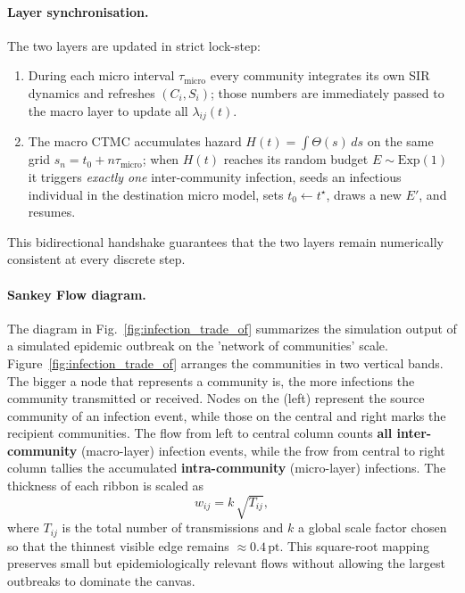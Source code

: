 \documentclass[
]{ceurart}
\newcommand{\Exp}{\mathrm{Exp}}
\begin{document}
\paragraph{Layer synchronisation.}
The two layers are updated in strict lock-step:
\begin{enumerate}\setlength{\itemsep}{2pt}
  \item During each micro interval $\tau_{\text{micro}}$
        every community integrates its own SIR dynamics and
        refreshes $(C_i,S_i)$; those numbers are immediately passed to
        the macro layer to update all $\lambda_{ij}(t)$.
  \item The macro CTMC accumulates hazard
        $H(t)=\int\Theta(s)\,ds$ on the same grid
        $s_n=t_0+n\tau_{\text{micro}}$; when $H(t)$ reaches its random
        budget $E\sim\Exp(1)$ it triggers \emph{exactly one}
        inter-community infection, seeds an infectious individual in the
        destination micro model, sets $t_0\leftarrow t^\star$, draws a
        new $E'$, and resumes.
\end{enumerate}
This bidirectional handshake guarantees that the two layers remain
numerically consistent at every discrete step.





\paragraph{Sankey Flow diagram.}


The diagram in Fig.~\ref{fig:infection_trade_of} summarizes the simulation
output of a simulated epidemic outbreak on the 'network of communities' scale.
Figure~\ref{fig:infection_trade_of} arranges the communities in two vertical
bands. The bigger a node that represents a community is, the more infections the community transmitted or received. Nodes on the (left) represent the source community
of an infection event, while those on the central and right marks the
recipient communities. 
The flow from left to central column counts \textbf{all inter-community} (macro-layer)
infection events, while the frow from central to right column tallies the accumulated
\textbf{intra-community} (micro-layer) infections.  
The thickness of each ribbon is scaled as
\[
w_{ij}=k\,\sqrt{T_{ij}},
\]
where $T_{ij}$ is the total number of transmissions and $k$ a
global scale factor chosen so that the thinnest visible edge remains
$\approx0.4\,\text{pt}$.  This square-root mapping preserves small but
epidemiologically relevant flows without allowing the largest outbreaks to
dominate the canvas. 
\end{document}

